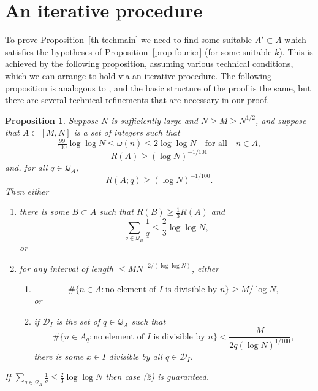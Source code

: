 \documentclass[12pt]{amsart}
\newtheorem{proposition}{Proposition}
\begin{document}
\section{An iterative procedure}
To prove Proposition~\ref{th-techmain} we need to find some suitable $A'\subset A$ which satisfies the hypotheses of Proposition~\ref{prop-fourier} (for some suitable $k$). This is achieved by the following proposition, assuming various technical conditions, which we can arrange to hold via an iterative procedure. The following proposition is analogous to \cite[Proposition 3]{Cr2003}, and the basic structure of the proof is the same, but there are several technical refinements that are necessary in our proof.

\begin{proposition}\label{prop-tech}
Suppose $N$ is sufficiently large and $N\geq M\geq N^{1/2}$, and suppose that $A\subset [M,N]$ is a set of integers such that
\[\tfrac{99}{100}\log\log N\leq \omega(n)\leq  2\log\log N\quad\textrm{for all}\quad n\in A,\]
\[R(A)\geq (\log N)^{-1/101}\]
and, for all $q\in \mathcal{Q}_A$,
\[R(A;q) \geq (\log N)^{-1/100}.\]
Then either
\begin{enumerate}
\item there is some $B\subset A$ such that $R(B)\geq \tfrac{1}{3}R(A)$ and 
\[\sum_{q\in \mathcal{Q}_{B}}\frac{1}{q}\leq \frac{2}{3}\log\log N,\]
or
\item for any interval of length $\leq MN^{-2/(\log \log N)}$, either
\begin{enumerate}
\item \[\# \{ n\in A : \textrm{no element of }I\textrm{ is divisible by }n\}\geq M/\log N,\]
or
\item if $\mathcal{D}_I$ is the set of $q\in\mathcal{Q}_A$ such that
\[\#\{ n\in A_q: \textrm{no element of }I\textrm{ is divisible by }n\}<\frac{M}{2q(\log N)^{1/100}},\]
there is some $x\in I$ divisible by all $q\in\mathcal{D}_I$.
\end{enumerate}
\end{enumerate}
If $\sum_{q\in\mathcal{Q}_A}\frac{1}{q}\leq \frac{2}{3}\log\log N$ then case (2) is guaranteed. 
\end{proposition}
\end{document}
